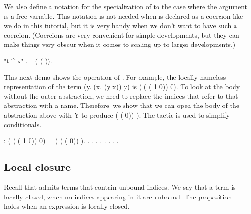 \documentclass[12pt]{report}
\begin{document}
We also define a notation for the specialization of  to
    the case where the argument is a free variable. This notation
    is not needed when  is declared as a coercion like
    we do in this tutorial, but it is very handy when we don't want
    to have such a coercion. (Coercions are very convenient for
    simple developments, but they can make things very obscur when
    it comes to scaling up to larger developments.)  \begin{coqdoccode}
\coqdocemptyline
\coqdocnoindent
{} "t \^{} x" := (  ( )).\coqdoceol
\coqdocemptyline
\end{coqdoccode}
This next demo shows the operation of .  For example, the
   locally nameless representation of the term (y. (x. (y x)) y)
   is  ( ( ( 1 0)) 0). To look at the body
   without the outer abstraction, we need to replace the indices that
   refer to that abstraction with a name.
   Therefore, we show that we can open the body of the abstraction
   above with Y to produce  ( (  0)) ).
   The tactic  is used to simplify conditionals.
\begin{coqdoccode}
\coqdocemptyline
\coqdocnoindent
{}  :\coqdoceol
\coqdocindent{1.00em}
 ( ( ( 1 0)) 0)  =\coqdoceol
\coqdocindent{3.50em}
( ( (  0)) ).\coqdoceol
\coqdocnoindent
{}.\coqdoceol
\coqdocindent{1.00em}
 .  . . . . .\coqdoceol
\coqdocnoindent
{}.\coqdoceol
\coqdocemptyline
\end{coqdoccode}
\subsection{Local closure}



 Recall that  admits terms that contain unbound indices. 
    We say that a term is locally closed, 
    when no indices appearing in it are unbound.  The proposition 
      holds when an expression  is locally closed.
\end{document}
